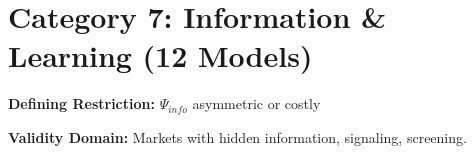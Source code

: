 \section{Category 7: Information \& Learning (12 Models)}
\label{sec:ms-information}

\begin{tcolorbox}[colback=gray!5!white, colframe=gray!75!black,
    title=\textbf{Information: The Asymmetry Extension}]

\textbf{Defining Restriction:} $\Psi_{info}$ asymmetric or costly

\textbf{Validity Domain:} Markets with hidden information, signaling, screening.

\end{tcolorbox}

